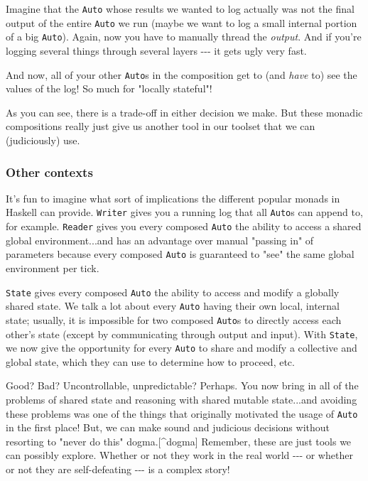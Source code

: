 \documentclass[]{article}
\begin{document}
Imagine that the \texttt{Auto} whose results we wanted to log actually was not
the final output of the entire \texttt{Auto} we run (maybe we want to log a
small internal portion of a big \texttt{Auto}). Again, now you have to manually
thread the \emph{output}. And if you're logging several things through several
layers -\/-\/- it gets ugly very fast.

And now, all of your other \texttt{Auto}s in the composition get to (and
\emph{have} to) see the values of the log! So much for "locally stateful"!

As you can see, there is a trade-off in either decision we make. But these
monadic compositions really just give us another tool in our toolset that we can
(judiciously) use.

\subsubsection{Other contexts}

It's fun to imagine what sort of implications the different popular monads in
Haskell can provide. \texttt{Writer} gives you a running log that all
\texttt{Auto}s can append to, for example. \texttt{Reader} gives you every
composed \texttt{Auto} the ability to access a shared global environment...and
has an advantage over manual "passing in" of parameters because every composed
\texttt{Auto} is guaranteed to "see" the same global environment per tick.

\texttt{State} gives every composed \texttt{Auto} the ability to access and
modify a globally shared state. We talk a lot about every \texttt{Auto} having
their own local, internal state; usually, it is impossible for two composed
\texttt{Auto}s to directly access each other's state (except by communicating
through output and input). With \texttt{State}, we now give the opportunity for
every \texttt{Auto} to share and modify a collective and global state, which
they can use to determine how to proceed, etc.

Good? Bad? Uncontrollable, unpredictable? Perhaps. You now bring in all of the
problems of shared state and reasoning with shared mutable state...and avoiding
these problems was one of the things that originally motivated the usage of
\texttt{Auto} in the first place! But, we can make sound and judicious decisions
without resorting to "never do this" dogma.{[}\^{}dogma{]} Remember, these are
just tools we can possibly explore. Whether or not they work in the real world
-\/-\/- or whether or not they are self-defeating -\/-\/- is a complex story!
\end{document}
